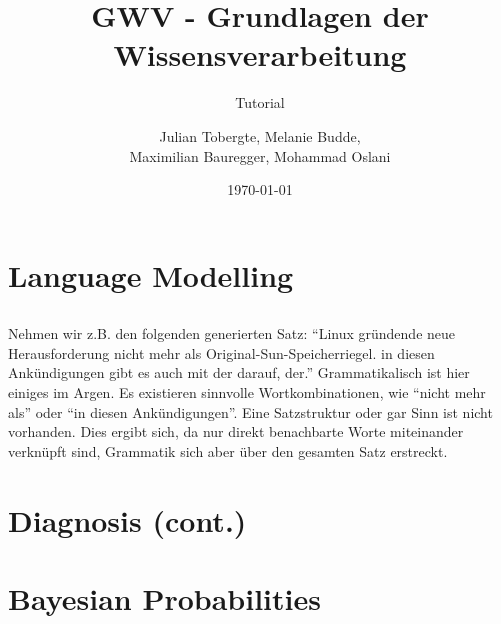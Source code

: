 \documentclass[DIV=9,numbers=noenddot]{scrartcl}
\title{GWV - Grundlagen der Wissensverarbeitung}
\subtitle{Tutorial \arabic{blatt}}
\author{Julian Tobergte, Melanie Budde,\\Maximilian Bauregger, Mohammad Oslani}
\date{\today}
\begin{document}
	\maketitle
	\section{Language Modelling}
		\setcounter{subsection}{1}
		\subsection{}
			Nehmen wir z.B. den folgenden generierten Satz: "`Linux gründende neue Herausforderung nicht mehr als Original-Sun-Speicherriegel. in diesen Ankündigungen gibt es auch mit der darauf, der."' Grammatikalisch ist hier einiges im Argen. Es existieren sinnvolle Wortkombinationen, wie "`nicht mehr als"' oder "`in diesen Ankündigungen"'. Eine Satzstruktur oder gar Sinn ist nicht vorhanden. Dies ergibt sich, da nur direkt benachbarte Worte miteinander verknüpft sind, Grammatik sich aber über den gesamten Satz erstreckt.
	\section{Diagnosis (cont.)}
	\section{Bayesian Probabilities}
\end{document}

